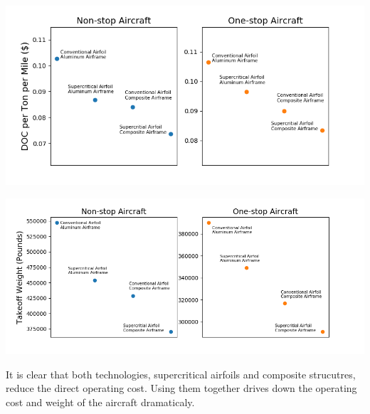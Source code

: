 \documentclass{article}
\begin{document}
        \begin{center}
            \includegraphics[scale=0.7]{tech.PNG}
            \label{fig:doc}
        \end{center}

        \begin{center}
            \includegraphics[scale=0.7]{tech_weight.PNG}
            \label{fig:weight}
        \end{center}

        \begin{flushleft}
            It is clear that both technologies, supercritical airfoils and
            composite strucutres, reduce the direct operating cost. Using them
            together drives down the operating cost and weight of the aircraft
            dramaticaly.
        \end{flushleft}
\end{document}
